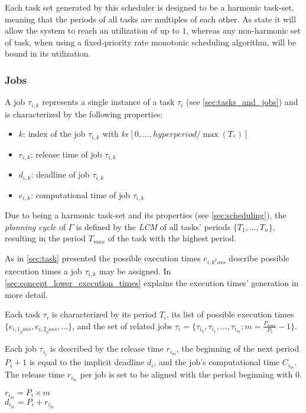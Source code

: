 Each task set generated by this scheduler is designed to be a harmonic task-set, meaning that the periods of all tasks are multiples of each other\cite{liuSchedulingAlgorithmsMultiprogramming1973,kuoLoadAdjustmentAdaptive1991}.
As \textcite{liuSchedulingAlgorithmsMultiprogramming1973} state it will allow the system to reach an utilization of up to $1$, whereas any non-harmonic set of task, when using a fixed-priority rate monotonic scheduling algorithm, will be bound in its utilization.

\subsubsection{Jobs}\label{sec:job}
A job $\tau_{i,k}$ represents a single instance of a task $\tau_i$ (see \cref{sec:tasks_and_jobs}) and is characterized by the following properties:
\begin{itemize}
	\item $k$: index of the job $\tau_{i,k}$ with $k \epsilon [0, \ldots, hyperperiod / \max(T_*)]$
	\item $r_{i,k}$: release time of job $\tau_{i,k}$
	\item $d_{i,k}$: deadline of job $\tau_{i,k}$
	\item $e_{i,k}$: computational time of job $\tau_{i,k}$
\end{itemize}

Due to being a harmonic task-set and its properties (see \cref{sec:scheduling}), the \textit{planning cycle}\cite{dar-tzenpengAssignmentSchedulingCommunicating1997} of $\Gamma$ is defined by the \textit{\ac{LCM}} of all tasks' periods $\{T_1, \ldots, T_n\}$, resulting in the period $T_{max}$ of the task with the highest period. 

As in \cref{sec:task} presented the possible execution times $e_{{i,k}^poss}$ describe possible execution times a job $\tau_{i,k}$ may be assigned.
In \cref{sec:concept_lower_execution_times} explains the execution times' generation in more detail.

Each task $\tau_i$ is characterized by its period $T_i$, its list of possible execution times $\{e_{{i,1}_poss}, e_{{i,2}_poss}, \ldots\}$, and the set of related jobs $\tau_i=\{\tau_{i_0}, \tau_{i_1}, \dots, \tau_{i_m}; m = \frac{P_{max}}{P_i} - 1\}$.

Each job $\tau_{i_j}$ is described by the release time $r_{i_m}$, the beginning of the next period $P_i+1$ is equal to the implicit deadline $d_i$, and the job's computational time $C_{i_m}$. The release time $r_{i_m}$ per job is set to be aligned with the period beginning with $0$.
\begin{center}
    $r_{i_m} = P_i \times m$ \\
    $d_{i_m} = P_i + r_{i_m}$
\end{center}

